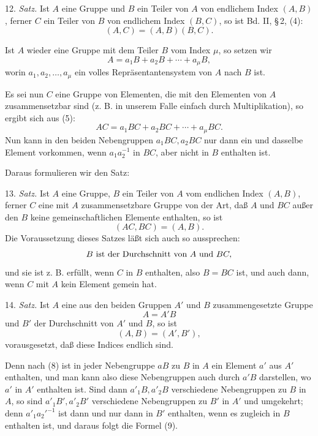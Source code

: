 \documentclass[11pt]{article}
\begin{document}
12. \emph{Satz.} Ist \(A\) eine Gruppe und \(B\) ein Teiler von \(A\) von endlichem Index \((A,B)\), ferner \(C\) ein Teiler von \(B\) von endlichem Index \((B,C)\), so ist Bd. II, \S\,2, (4):
\begin{equation}
 (A,C)=(A,B)(B,C).
\tag{4}
\end{equation}

Ist \(A\) wieder eine Gruppe mit dem Teiler \(B\) vom Index \(\mu\), so setzen wir
\begin{equation}
 A=a_1B+a_2B+\cdots+a_\mu B,
\tag{5}
\end{equation}
worin \(a_1,a_2,\ldots,a_\mu\) ein volles Repräsentantensystem von \(A\) nach \(B\) ist.

Es sei nun \(C\) eine Gruppe von Elementen, die mit den Elementen von \(A\) zusammensetzbar sind (z. B. in unserem Falle einfach durch Multiplikation), so ergibt sich aus (5):
\begin{equation}
 AC=a_1BC+a_2BC+\cdots+a_\mu BC.
\tag{6}
\end{equation}
Nun kann in den beiden Nebengruppen \(a_1BC,a_2BC\) nur dann ein und dasselbe Element vorkommen, wenn \(a_1a_2^{-1}\) in \(BC\), aber nicht in \(B\) enthalten ist.

Daraus formulieren wir den Satz:

13. \emph{Satz.} Ist \(A\) eine Gruppe, \(B\) ein Teiler von \(A\) vom endlichen Index \((A,B)\), ferner \(C\) eine mit \(A\) zusammensetzbare Gruppe von der Art, daß \(A\) und \(BC\) außer den \(B\) keine gemeinschaftlichen Elemente enthalten, so ist
\begin{equation}
 (AC,BC)=(A,B).
\tag{7}
\end{equation}
Die Voraussetzung dieses Satzes läßt sich auch so aussprechen:
\[
 B\hbox{ ist der Durchschnitt von }A\hbox{ und }BC,
\]
und sie ist z. B. erfüllt, wenn \(C\) in \(B\) enthalten, also \(B=BC\) ist, und auch dann, wenn \(C\) mit \(A\) kein Element gemein hat.

14. \emph{Satz.} Ist \(A\) eine aus den beiden Gruppen \(A'\) und \(B\) zusammengesetzte Gruppe
\begin{equation}
 A=A'B
\tag{8}
\end{equation}
und \(B'\) der Durchschnitt von \(A'\) und \(B\), so ist
\begin{equation}
 (A,B)=(A',B'),
\tag{9}
\end{equation}
vorausgesetzt, daß diese Indices endlich sind.

Denn nach (8) ist in jeder Nebengruppe \(aB\) zu \(B\) in \(A\) ein Element \(a'\) aus \(A'\) enthalten, und man kann also diese Nebengruppen auch durch \(a'B\) darstellen, wo \(a'\) in \(A'\) enthalten ist. Sind dann \(a'_1B,a'_2B\) verschiedene Nebengruppen zu \(B\) in \(A\), so sind \(a'_1B',a'_2B'\) verschiedene Nebengruppen zu \(B'\) in \(A'\) und umgekehrt; denn \(a'_1a_2'^{-1}\) ist dann und nur dann in \(B'\) enthalten, wenn es zugleich in \(B\) enthalten ist, und daraus folgt die Formel (9).
\end{document}
